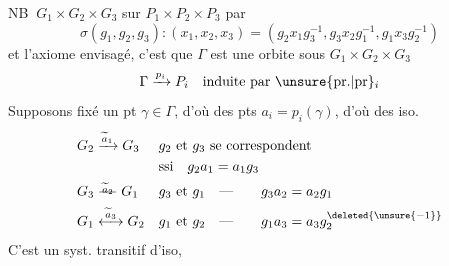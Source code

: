 NB \(\ G_1\times G_2\times G_3\)  sur \(P_1\times P_2\times P_3\) par
\[
 \sigma(g_1,g_2,g_3)\mathbin{:}(x_1,x_2,x_3)
 =(g_2x_1g_3^{-1},g_3x_2g_1^{-1},g_1x_3g_2^{-1})
\]
et l'axiome envisagé, c'est que \(\Gamma\) est une orbite sous \(G_1\times G_2\times G_3\)
\[
 \Gamma\xrightarrow{p_i}P_i\quad\text{induite par \unsure{pr.|pr}$_i$}
\]
 Supposons fixé un pt \(\gamma\in \Gamma\), d'où des pts \(a_i=p_i(\gamma)\), d'où des iso.
\[
\begin{aligned}
 G_2&\xrightarrow{\widetilde a_1}G_3&
 &g_2\text{ et }g_3\text{ se correspondent}\\
 &&&\text{ssi}\quad g_2a_1=a_1g_3\\
 G_3&\overset{\widetilde a_2}{\relbar\joinrel\relbar} G_1&
 &g_3\text{ et }g_1\quad\text{---}\qquad g_3a_2=a_2g_1\\
 G_1&\overset{\widetilde a_3}{\longleftrightarrow}G_2&
 &g_1\text{ et }g_2\quad\text{---}\qquad g_1a_3=a_3g_2^{\deleted{\unsure{-1}}}
\end{aligned}
\]
C'est un syst. transitif d'iso, 
